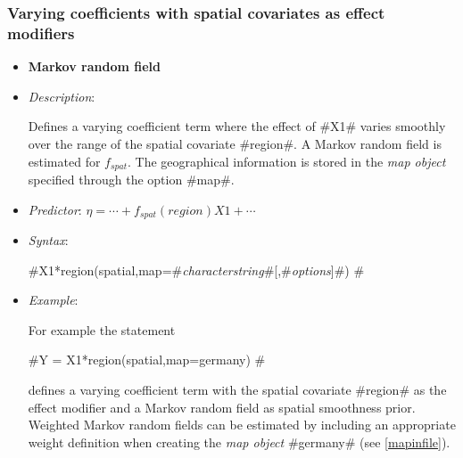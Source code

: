 \subsubsection*{Varying coefficients with spatial covariates as
effect modifiers}

\begin{itemize}
\item[]{\bf\sffamily Markov random field}

\item[] {\em Description}:

Defines a varying coefficient term where the effect of #X1# varies
smoothly over the range of the spatial covariate #region#. A
Markov random field is estimated for $f_{spat}$. The geographical
information is stored in the {\em map object} specified through
the option #map#.
\item[] {\em Predictor}: $\eta = \cdots + f_{spat}(region)X1 + \cdots$
\item[] {\em Syntax}:

#X1*region(spatial,map=#{\em characterstring}#[,#{\em options}]#) #
\item[] {\em Example}:

For example the statement

#Y = X1*region(spatial,map=germany) #

defines a varying coefficient term with the spatial covariate
#region# as the effect modifier and a Markov random field as spatial
smoothness prior. Weighted Markov random fields can be estimated by
including an appropriate weight definition when creating the {\em
map object} #germany# (see \autoref{mapinfile}).
\end{itemize}




